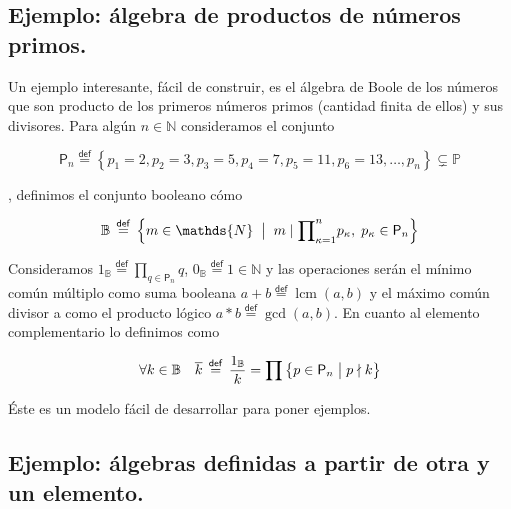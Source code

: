 \documentclass[final,12pt,a4paper,twoside,fleqn]{extbook}
\newcommand{\mathdef}{\ensuremath{\stackrel{\mathsf{def}}{{}={}}}}
\newcommand{\set}[1]{\ensuremath{\left\lbrace{#1}\right\rbrace}}
\newcommand {\setCompr}[2]{
	\ensuremath{
		\left\lbrace{ 
			#1 {\;\big{\vert}\;} #2
        }\right\rbrace
    }
}
\DeclareMathOperator{\lcm}{lcm}
\newcommand{\setN}{\ensuremath{\mathds{N}}}
\newcommand{\setB}{\ensuremath{\mathbb{B}}}
\newcommand{\setP}{\ensuremath{}\mathbb{P}}
\theoremstyle{definition}
\theoremstyle{remark}
\begin{document}
\subsection{Ejemplo: álgebra de productos de números primos.}



	Un ejemplo interesante, fácil de construir, es el álgebra de Boole de los
números que son producto de los primeros números primos (cantidad finita de
ellos) y sus divisores. Para algún $n \in \setN$ consideramos el conjunto



\begin{equation}
\mathsf{P}_{n} \mathdef \set{p_1 = 2, p_2 = 3, p_3 = 5,p_4 = 7, p_5 = 11,
p_6 = 13,\ldots,p_n} \subsetneq \setP
\end{equation}



, definimos el conjunto booleano cómo



\begin{equation}
\setB \mathdef {
\setCompr
{m \in \setN\;} 
{\;m \mid {\prod}_{\kappa=1}^{n} p_{\kappa},\;p_{\kappa} \in \mathsf{P}_{n}}
}
\end{equation}



	Consideramos $1_{\setB} \mathdef {\prod}_{q \in \mathsf{P}_{n}} q$, 
$0_{\setB} \mathdef 1\in\setN$ y las operaciones serán el
mínimo común múltiplo como suma booleana \(a + b \mathdef
\lcm\left(a,b\right)\) y el máximo común divisor a como el producto
lógico $a* b\mathdef\gcd\left(a,b\right)$. En cuanto al elemento
complementario lo definimos como 



\begin{equation}
\forall k \in \setB 
\quad 
{\overline k} 
\mathdef 
\frac{1_{\setB}}{k} = 
{\prod \setCompr{p \in \mathsf{P}_n}{p \nmid k } }
\end{equation}



	Éste es un modelo fácil de desarrollar para poner ejemplos.



\subsection{Ejemplo: álgebras definidas a partir de otra y un elemento.}
\end{document}
